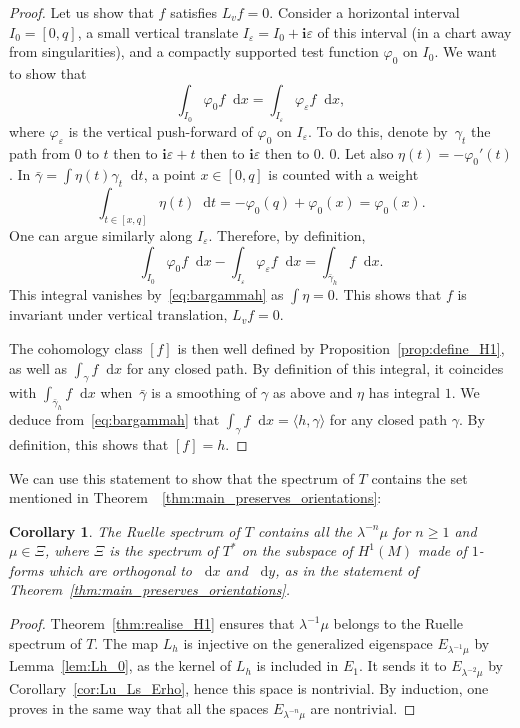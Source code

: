 \documentclass[JEP,XML,SOM,Unicode]{cedram}
\newcommand{\dd}{\mathop{}\!\mathrm{d}}
\newcommand{\ic}{\mathbf{i}}
\let\epsilon\varepsilon
\let\phi\varphi
\newtheorem{cor}[thm]{Corollary}
\theoremstyle{definition}
\numberwithin{equation}{section}
\begin{document}
\begin{proof}
Let us show that $f$ satisfies $L_v f = 0$. Consider a horizontal interval
$I_0 = [0, q]$, a small vertical translate $I_\epsilon = I_0+\ic \epsilon$ of
this interval (in a chart away from singularities), and a compactly supported
test function $\phi_0$ on $I_0$. We want to show that
\[
\int_{I_0} \phi_0 f
\dd x = \int_{I_\epsilon} \phi_\epsilon f \dd x,
\]
where $\phi_\epsilon$ is the
vertical push-forward of $\phi_0$ on $I_\epsilon$. To do this, denote by~$\gamma_t$ the path from $0$ to $t$ then to $\ic \epsilon+t$ then to
$\ic\epsilon$ then to $0$. $0$. Let also \hbox{$\eta(t) = -\phi_0'(t)$}. In
$\bar\gamma=\int \eta(t) \gamma_t \dd t$, a point $x \in [0,q]$ is counted
with a weight
\[
\int_{t \in [x,q]} \eta(t) \dd t = -\phi_0(q) + \phi_0(x) =
\phi_0(x).
\]
One can argue similarly along $I_\epsilon$. Therefore, by
definition,
\[
\int_{I_0} \phi_0 f \dd x - \int_{I_\epsilon} \phi_\epsilon f
\dd x = \int_{\bar \gamma_h} f \dd x.
\]
This integral vanishes
by~\eqref{eq:bargammah} as $\int \eta=0$. This shows that $f$ is invariant
under vertical translation, \ie $L_v f = 0$.

The cohomology class $[f]$ is then well defined by
Proposition~\ref{prop:define_H1}, as well as $\int_\gamma f \dd x$ for any
closed path. By definition of this integral, it coincides with
$\int_{\bar\gamma_h} f \dd x$ when~$\bar\gamma$ is a smoothing of $\gamma$ as
above and $\eta$ has integral $1$. We deduce from~\eqref{eq:bargammah} that
$\int_\gamma f \dd x= \langle h, \gamma \rangle$ for any closed path
$\gamma$. By definition, this shows that $[f] = h$.
\end{proof}

We can use this statement to show that the spectrum of $T$ contains the set
mentioned in Theorem~~\ref{thm:main_preserves_orientations}:

\begin{cor}
\label{cor:spectre_contient} The Ruelle spectrum of $T$ contains all the
$\lambda^{-n} \mu$ for $n\geq 1$ and $\mu \in \Xi$, where $\Xi$ is the
spectrum of $T^*$ on the subspace of $H^1(M)$ made of $1$-forms which are
orthogonal to $\dd x$ and $\dd y$, as in the statement of
Theorem~\ref{thm:main_preserves_orientations}.
\end{cor}
\begin{proof}
Theorem~\ref{thm:realise_H1} ensures that $\lambda^{-1} \mu$ belongs to the
Ruelle spectrum of $T$. The map $L_h$ is injective on the generalized
eigenspace $E_{\lambda^{-1}\mu}$ by Lemma~\ref{lem:Lh_0}, as the kernel of
$L_h$ is included in $E_1$. It sends it to $E_{\lambda^{-2}\mu}$ by
Corollary~\ref{cor:Lu_Ls_Erho}, hence this space is nontrivial. By induction,
one proves in the same way that all the spaces $E_{\lambda^{-n}\mu}$ are
nontrivial.
\end{proof}
\end{document}
